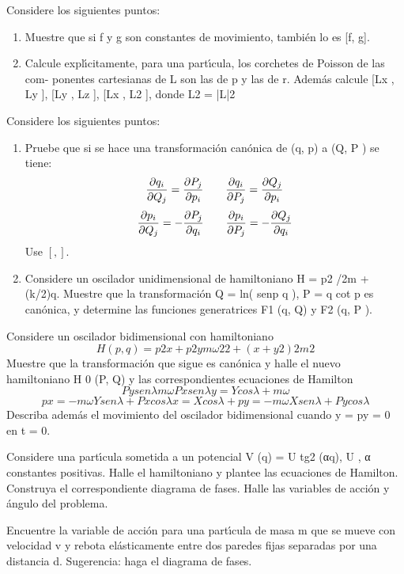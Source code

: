 \documentclass[10pt,oneside]{CBFT_book}
\begin{document}
\begin{ejercicios}
\label{ej20}
\item{ \bf }
Considere los siguientes puntos:
\begin{enumerate}[label=(\alph*)]
\item Muestre que si f y g son constantes de movimiento, también lo es [f, g].
\item Calcule explı́citamente, para una partı́cula, los corchetes de Poisson de las com-
ponentes cartesianas de L son las de p y las de r. Además calcule [Lx , Ly ],
[Ly , Lz ], [Lx , L2 ], donde L2 = |L|2
\end{enumerate}


\label{ej21}
\item{ \bf }
Considere los siguientes puntos:
\begin{enumerate}[label=(\alph*)]
\item Pruebe que si se hace una transformación canónica de (q, p) a (Q, P ) se tiene:
\[
	\frac{\partial^{\hspace{-0.05em}} {q_i}}{\partial {Q_j}^{\hspace{-0.05em}}} = \frac{\partial^{\hspace{-0.05em}} {P_j}}{\partial {p_i}^{\hspace{-0.05em}}} \qquad  \frac{\partial^{\hspace{-0.05em}} {q_i}}{\partial {P_j}^{\hspace{-0.05em}}} = \frac{\partial^{\hspace{-0.05em}} {Q_j}}{\partial {p_i}^{\hspace{-0.05em}}}
\]
\[
	\frac{\partial^{\hspace{-0.05em}} {p_i}}{\partial {Q_j}^{\hspace{-0.05em}}} = -\frac{\partial^{\hspace{-0.05em}} {P_j}}{\partial {q_i}^{\hspace{-0.05em}}} \qquad  \frac{\partial^{\hspace{-0.05em}} {p_i}}{\partial {P_j}^{\hspace{-0.05em}}} = -\frac{\partial^{\hspace{-0.05em}} {Q_j}}{\partial {q_i}^{\hspace{-0.05em}}}
\]
Use $[,]$.
\item Considere un oscilador unidimensional de hamiltoniano H = p2 /2m + (k/2)q.
Muestre que la transformación Q = ln( senp
q ), P = q cot p es canónica, y determine
las funciones generatrices F1 (q, Q) y F2 (q, P ).
\end{enumerate}


\label{ej22}
\item{ \bf }
Considere un oscilador bidimensional con hamiltoniano
\[
H(p, q) = p2x + p2y mω 2 2 + (x + y 2 ) 2m 2
\]
Muestre que la transformación que sigue es canónica y halle el nuevo hamiltoniano
H 0 (P, Q) y las correspondientes ecuaciones de Hamilton
\[
	Py senλ mω Px senλ
	y = Y cos λ + mω
\]
\[
	px = −mωY senλ + Px cos λ
	x = X cos λ +
	py = −mωXsenλ + Py cos λ
\]
Describa además el movimiento del oscilador bidimensional cuando y = py = 0 en t = 0.

\label{ej23}
\item{ \bf }
Considere una partı́cula sometida a un potencial V (q) = U tg2 (αq), U , α constantes
positivas. Halle el hamiltoniano y plantee las ecuaciones de Hamilton. Construya el
correspondiente diagrama de fases. Halle las variables de acción y ángulo del problema.

\label{ej24}
\item{ \bf }
Encuentre la variable de acción para una partı́cula de masa m que se mueve con
velocidad v y rebota elásticamente entre dos paredes fijas separadas por una distancia
d. Sugerencia: haga el diagrama de fases.


\end{ejercicios}
\end{document}
